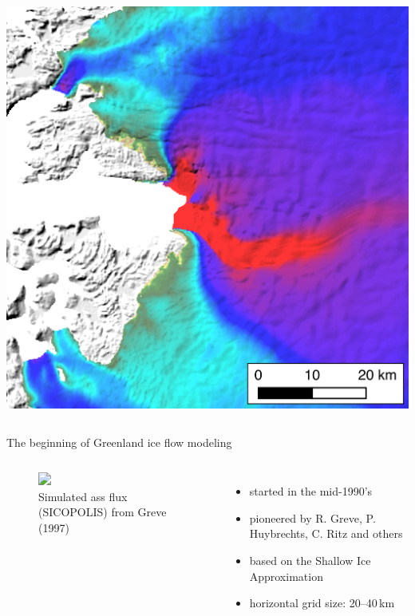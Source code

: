 \documentclass[hide notes,intlimits]{beamer}
\begin{document}
\begin{frame}[plain]
\begin{columns}
    \medskip
    \includegraphics[width=\textwidth]{jakobshavn-obs-nogate}
  \end{columns}
\end{frame}


\begin{frame}{The beginning of Greenland ice flow modeling}
  \begin{columns}
    \column[c]{4.25cm}
    \begin{figure}
      \includegraphics<1>[height=.65\textheight]{greve_1997_mass_flux}
      \small 
      \caption{Simulated ass flux (SICOPOLIS) from Greve (1997)}
    \end{figure}
    \column[c]{6.75cm}
    \begin{itemize}
      \item started in the mid-1990's
      \item pioneered by R. Greve, P. Huybrechts, C. Ritz and others
      \item based on the Shallow Ice Approximation
      \item horizontal grid size: 20--40\,km
    \end{itemize}
  \end{columns}
\end{frame}
\end{document}

